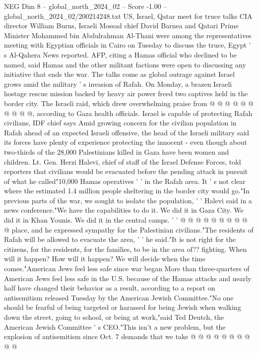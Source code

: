 \begin{textsample}{NEG Dim 8 – global\_north\_2024\_02 – Score -1.00 – global\_north\_2024\_02/200214248.txt}
US, Israel, Qatar meet for truce talks CIA director William Burns, Israeli Mossad chief David Barnea and Qatari Prime Minister Mohammed bin Abdulrahman Al-Thani were among the representatives meeting with Egyptian officials in Cairo on Tuesday to discuss the truce, Egypt ' s Al-Qahera News reported.
AFP, citing a Hamas official who declined to be named, said Hamas and the other militant factions were open to discussing any initiative that ends the war.
The talks come as global outrage against Israel grows amid the military ' s invasion of Rafah.
On Monday, a brazen Israeli hostage rescue mission backed by heavy air power freed two captives held in the border city.
The Israeli raid, which drew overwhelming praise from @ @ @ @ @ @ @ @ @ @, according to Gaza health officials.
Israel is capable of protecting Rafah civilians, IDF chief says Amid growing concern for the civilian population in Rafah ahead of an expected Israeli offensive, the head of the Israeli military said its forces have plenty of experience protecting the innocent - even though about two-thirds of the 28,000 Palestinians killed in Gaza have been women and children.
Lt.
Gen.
Herzi Halevi, chief of staff of the Israel Defense Forces, told reporters that civilians would be evacuated before the pending attack in pursuit of what he called"10,000 Hamas operatives ' ' in the Rafah area.
It ' s not clear where the estimated 1.4 million people sheltering in the border city would go."In previous parts of the war, we sought to isolate the population, ' ' Halevi said in a news conference."We have the capabilities to do it.
We did it in Gaza City.
We did it in Khan Younis.
We did it in the central camps. ' ' @ @ @ @ @ @ @ @ @ @ place, and he expressed sympathy for the Palestinian civilians."The residents of Rafah will be allowed to evacuate the area, ' ' he said."It is not right for the citizens, for the residents, for the families, to be in the area of?? fighting.
When will it happen?
How will it happen?
We will decide when the time comes."American Jews feel less safe since war began More than three-quarters of American Jews feel less safe in the U.S. because of the Hamas attacks and nearly half have changed their behavior as a result, according to a report on antisemitism released Tuesday by the American Jewish Committee."No one should be fearful of being targeted or harassed for being Jewish when walking down the street, going to school, or being at work,"said Ted Deutch, the American Jewish Committee ' s CEO."This isn't a new problem, but the explosion of antisemitism since Oct. 7 demands that we take @ @ @ @ @ @ @ @ @ @

\end{textsample}
